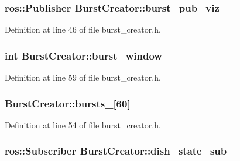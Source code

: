 \subsubsection[{burst\-\_\-pub\-\_\-viz\-\_\-}]{\setlength{\rightskip}{0pt plus 5cm}ros\-::\-Publisher {\bf \-Burst\-Creator\-::burst\-\_\-pub\-\_\-viz\-\_\-}\hspace{0.3cm}{\ttfamily  [private]}}\label{classBurstCreator_ae7d05b0e866d99e96a378f62c1836c72}


\-Definition at line 46 of file burst\-\_\-creator.\-h.

\subsubsection[{burst\-\_\-window\-\_\-}]{\setlength{\rightskip}{0pt plus 5cm}int {\bf \-Burst\-Creator\-::burst\-\_\-window\-\_\-}\hspace{0.3cm}{\ttfamily  [private]}}\label{classBurstCreator_ad942ac5694f5765da1b1a49f3ac51ffe}


\-Definition at line 59 of file burst\-\_\-creator.\-h.

\subsubsection[{bursts\-\_\-}]{ {\bf \-Burst\-Creator\-::bursts\-\_\-}[60]\hspace{0.3cm}{\ttfamily  [private]}}\label{classBurstCreator_ad45ae072ecb8ee5c895926cd4474fa7c}


\-Definition at line 54 of file burst\-\_\-creator.\-h.

\subsubsection[{dish\-\_\-state\-\_\-sub\-\_\-}]{\setlength{\rightskip}{0pt plus 5cm}ros\-::\-Subscriber {\bf \-Burst\-Creator\-::dish\-\_\-state\-\_\-sub\-\_\-}\hspace{0.3cm}{\ttfamily  [private]}}\label{classBurstCreator_a8f031e07319a88555b998b08f67ca761}


